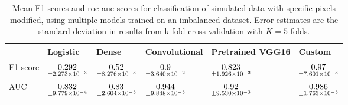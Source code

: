 \begin{table}
\centering
\caption{
Mean F1-scores and roc-auc scores for classification of simulated data with specific pixels
modified, using multiple models trained on an imbalanced dataset. Error estimates are the 
standard deviation in results from k-fold cross-validation with $K=5$ folds.
}
\label{tab:classification-simulated-pixelmod-f1-auc}
\begin{tabular}{llllll}
\toprule
{} &                                            Logistic &                                              Dense &                                       Convolutional &                                    Pretrained VGG16 &                                              Custom \\
\midrule
F1-score &  $\underset{\num{+- 2.273e-03 }  }{\num{ 0.292 } }$ &  $\underset{\num{+- 8.276e-03 }  }{\num{ 0.52 } }$ &  $\underset{\num{+- 3.640e-02 }  }{\num{ 0.9 } }$ &  $\underset{\num{+- 1.926e-02 }  }{\num{ 0.823 } }$ &  $\underset{\num{+- 7.601e-03 }  }{\num{ 0.97 } }$ \\
AUC      &  $\underset{\num{+- 9.779e-04 }  }{\num{ 0.832 } }$ &  $\underset{\num{+- 2.604e-03 }  }{\num{ 0.83 } }$ &  $\underset{\num{+- 9.848e-03 }  }{\num{ 0.944 } }$ &  $\underset{\num{+- 9.530e-03 }  }{\num{ 0.92 } }$ &  $\underset{\num{+- 1.763e-03 }  }{\num{ 0.986 } }$ \\
\bottomrule
\end{tabular}
\end{table}
